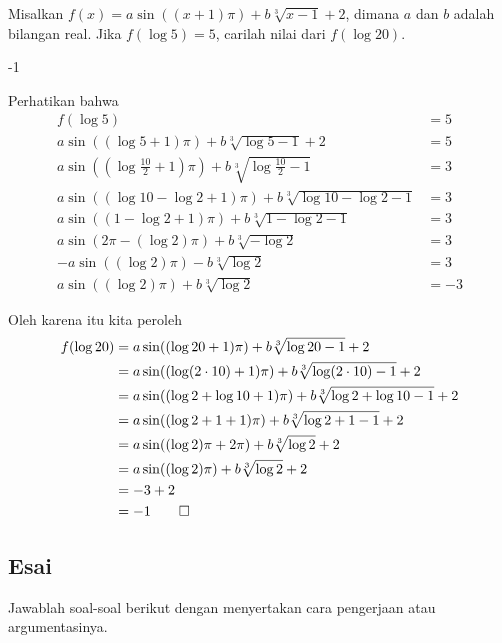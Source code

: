\documentclass[11pt]{scrartcl}
\begin{document}
	\begin{soalbaru}
		Misalkan $f(x)=a\sin((x+1)\pi) + b\sqrt[3]{x-1}+2$, dimana $a$ dan $b$ adalah bilangan real. Jika $f(\log 5)=5$, carilah nilai dari $f(\log 20)$.
		
		\begin{jawaban}
		-1
		\end{jawaban}
		\begin{solusi}
		Perhatikan bahwa 
		\begin{equation*}
		\begin{split}
		f(\log 5)&=5\\
		a\sin((\log 5+1)\pi) + b\sqrt[3]{\log 5-1}+2&=5\\
		a\sin((\log \frac{10}{2}+1)\pi) + b\sqrt[3]{\log \frac{10}{2}-1}&=3\\
		a\sin((\log 10 - \log 2+1)\pi) + b\sqrt[3]{\log 10 - \log 2 -1}&=3\\
		a\sin((1 - \log 2+1)\pi) + b\sqrt[3]{1 - \log 2 -1}&=3\\
		a\sin(2\pi - (\log 2)\pi) + b\sqrt[3]{- \log 2}&=3\\
		-a\sin((\log 2)\pi) - b\sqrt[3]{\log 2}&=3\\
		a\sin((\log 2)\pi) + b\sqrt[3]{\log 2}&=-3
		\end{split}
		\end{equation*}
		
		Oleh karena itu kita peroleh
				\begin{equation*}
				\begin{split}
				f(\log 20)&=a\sin((\log 20+1)\pi) + b\sqrt[3]{\log 20-1}+2\\
						  &=a\sin((\log (2\cdot10)+1)\pi) + b\sqrt[3]{\log (2\cdot10)-1}+2\\
						  &=a\sin((\log 2 +\log 10+1)\pi) + b\sqrt[3]{\log 2+\log 10-1}+2\\
						  &=a\sin((\log 2 +1+1)\pi) + b\sqrt[3]{\log 2+1-1}+2\\
						  &=a\sin((\log 2)\pi+2\pi) + b\sqrt[3]{\log 2}+2\\
						  &=a\sin((\log 2)\pi) + b\sqrt[3]{\log 2}+2\\
						  &=-3+2\\
						  &=-1 \qed
				\end{split}
				\end{equation*}
		\end{solusi}
	\end{soalbaru}
\newpage
\subsection{Esai}
Jawablah soal-soal berikut dengan menyertakan cara pengerjaan atau argumentasinya.
	
\end{document}
